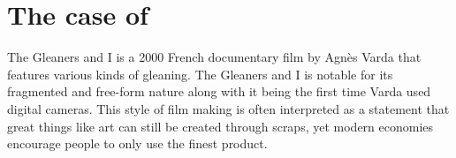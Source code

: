 









%
%
\section{The case of }
The Gleaners and I is a 2000 French documentary film by Agnès Varda that features various kinds of gleaning. The Gleaners and I is notable for its fragmented and free-form nature along with it being the first time Varda used digital cameras. This style of film making is often interpreted as a statement that great things like art can still be created through scraps, yet modern economies encourage people to only use the finest product.

